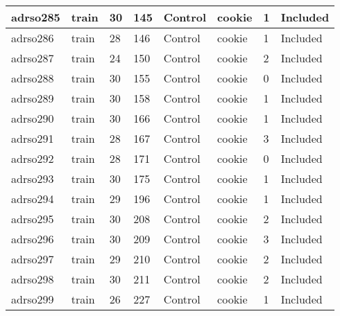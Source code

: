 \begin{center}
\begin{longtable}{|l|l|l|l|l|l|l|l|}
adrso285  & train            & 30           & 145         & Control              & cookie          & 1                & Included      \\ \hline
adrso286  & train            & 28           & 146         & Control              & cookie          & 1                & Included      \\ \hline
adrso287  & train            & 24           & 150         & Control              & cookie          & 2                & Included      \\ \hline
adrso288  & train            & 30           & 155         & Control              & cookie          & 0                & Included      \\ \hline
adrso289  & train            & 30           & 158         & Control              & cookie          & 1                & Included      \\ \hline
adrso290  & train            & 30           & 166         & Control              & cookie          & 1                & Included      \\ \hline
adrso291  & train            & 28           & 167         & Control              & cookie          & 3                & Included      \\ \hline
adrso292  & train            & 28           & 171         & Control              & cookie          & 0                & Included      \\ \hline
adrso293  & train            & 30           & 175         & Control              & cookie          & 1                & Included      \\ \hline
adrso294  & train            & 29           & 196         & Control              & cookie          & 1                & Included      \\ \hline
adrso295  & train            & 30           & 208         & Control              & cookie          & 2                & Included      \\ \hline
adrso296  & train            & 30           & 209         & Control              & cookie          & 3                & Included      \\ \hline
adrso297  & train            & 29           & 210         & Control              & cookie          & 2                & Included      \\ \hline
adrso298  & train            & 30           & 211         & Control              & cookie          & 2                & Included      \\ \hline
adrso299  & train            & 26           & 227         & Control              & cookie          & 1                & Included      \\ \hline

\end{longtable}
\end{center}
